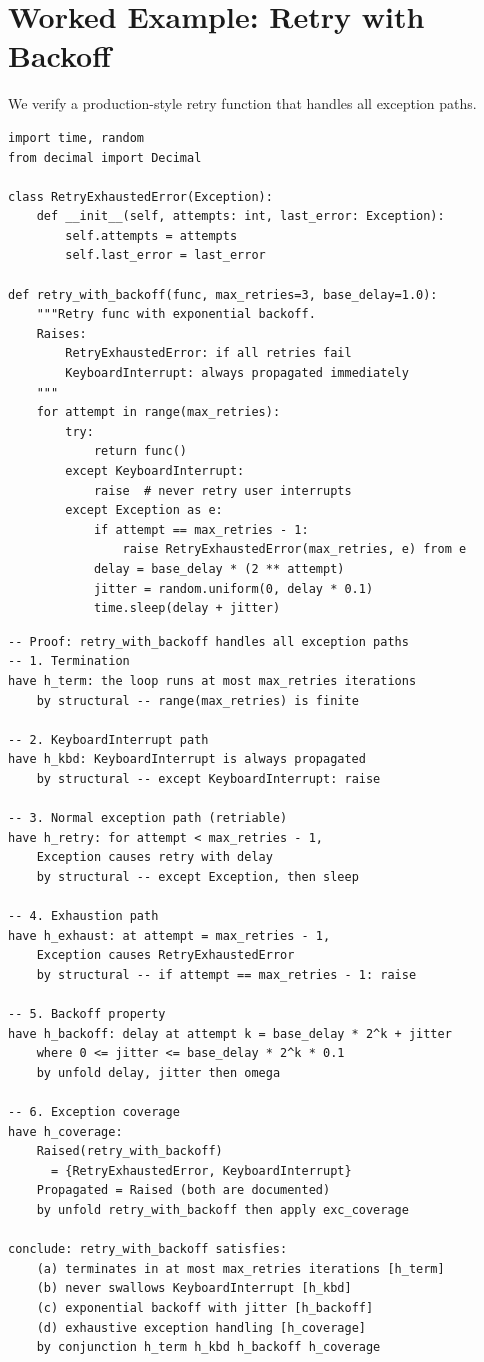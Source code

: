 \documentclass[11pt,a4paper]{report}
\theoremstyle{definition}
\theoremstyle{plain}
\begin{document}
\section{Worked Example: Retry with Backoff}

We verify a production-style retry function that handles all exception paths.

\begin{lstlisting}[style=python]
import time, random
from decimal import Decimal

class RetryExhaustedError(Exception):
    def __init__(self, attempts: int, last_error: Exception):
        self.attempts = attempts
        self.last_error = last_error

def retry_with_backoff(func, max_retries=3, base_delay=1.0):
    """Retry func with exponential backoff.
    Raises:
        RetryExhaustedError: if all retries fail
        KeyboardInterrupt: always propagated immediately
    """
    for attempt in range(max_retries):
        try:
            return func()
        except KeyboardInterrupt:
            raise  # never retry user interrupts
        except Exception as e:
            if attempt == max_retries - 1:
                raise RetryExhaustedError(max_retries, e) from e
            delay = base_delay * (2 ** attempt)
            jitter = random.uniform(0, delay * 0.1)
            time.sleep(delay + jitter)
\end{lstlisting}

\begin{lstlisting}[style=proof]
-- Proof: retry_with_backoff handles all exception paths
-- 1. Termination
have h_term: the loop runs at most max_retries iterations
    by structural -- range(max_retries) is finite

-- 2. KeyboardInterrupt path
have h_kbd: KeyboardInterrupt is always propagated
    by structural -- except KeyboardInterrupt: raise

-- 3. Normal exception path (retriable)
have h_retry: for attempt < max_retries - 1,
    Exception causes retry with delay
    by structural -- except Exception, then sleep

-- 4. Exhaustion path
have h_exhaust: at attempt = max_retries - 1,
    Exception causes RetryExhaustedError
    by structural -- if attempt == max_retries - 1: raise

-- 5. Backoff property
have h_backoff: delay at attempt k = base_delay * 2^k + jitter
    where 0 <= jitter <= base_delay * 2^k * 0.1
    by unfold delay, jitter then omega

-- 6. Exception coverage
have h_coverage:
    Raised(retry_with_backoff)
      = {RetryExhaustedError, KeyboardInterrupt}
    Propagated = Raised (both are documented)
    by unfold retry_with_backoff then apply exc_coverage

conclude: retry_with_backoff satisfies:
    (a) terminates in at most max_retries iterations [h_term]
    (b) never swallows KeyboardInterrupt [h_kbd]
    (c) exponential backoff with jitter [h_backoff]
    (d) exhaustive exception handling [h_coverage]
    by conjunction h_term h_kbd h_backoff h_coverage
\end{lstlisting}
\end{document}
